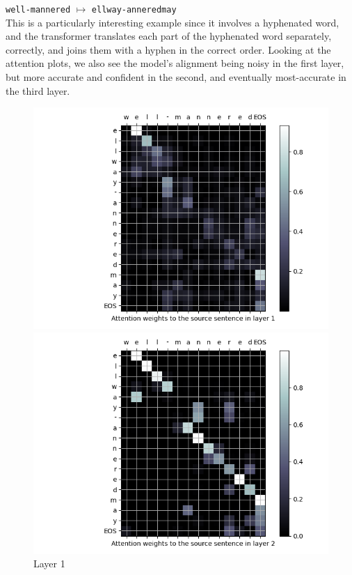 \begin{enumarabic}
  \newpage
  \item \verb|well-mannered| $\mapsto$ \verb|ellway-anneredmay| \\
    This is a particularly interesting example since it involves a hyphenated word,
    and the transformer translates each part of the hyphenated word separately,
    correctly, and joins them with a hyphen in the correct order.
    Looking at the attention plots, we also see the model's alignment
    being noisy in the first layer, but more accurate and confident in the second,
    and eventually most-accurate in the third layer.
    \begin{figure}[H]
      \centering
      \begin{minipage}[b]{0.33\textwidth}
        \centering
        \includegraphics[width=\textwidth]{figures/well-mannered-0.png}
        \caption{Layer 1}
        \label{fig:well-mannered-0}
      \end{minipage}
      \hfill
      \begin{minipage}[b]{0.33\textwidth}
        \centering
        \includegraphics[width=\textwidth]{figures/well-mannered-1.png}

\end{minipage}
\end{figure}
\end{enumarabic}
